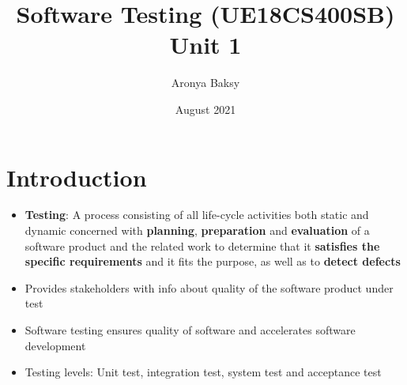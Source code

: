 \documentclass{article}
\title{Software Testing (UE18CS400SB) \\ Unit 1}
\author{Aronya Baksy}
\date{August 2021}
\begin{document}
\maketitle

\section{Introduction}
\begin{itemize}
    
    \item \textbf{Testing}: A process consisting of all life-cycle activities both static and dynamic concerned with \textbf{planning}, \textbf{preparation} and \textbf{evaluation} of a software product and the related work to determine that it \textbf{satisfies the specific requirements} and it fits the purpose, as well as to \textbf{detect defects}
    
    \item Provides stakeholders with info about quality of the software product under test
    
    \item Software testing ensures quality of software and accelerates software development
    
    \item Testing levels: Unit test, integration test, system test and acceptance test
\end{itemize}
\end{document}

